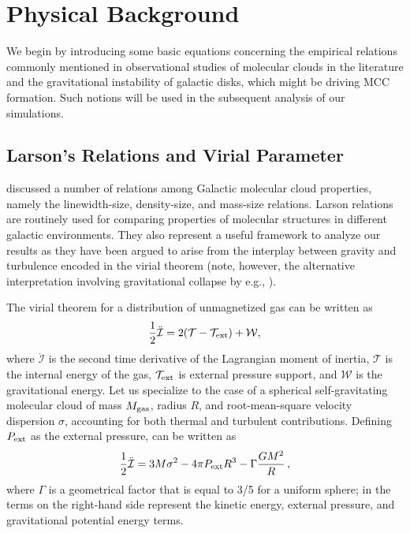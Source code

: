 \IfFileExists{emulateapjlegacy.cls}{\documentclass[iop]{emulateapjlegacy}}{\documentclass[iop]{emulateapj}}
\begin{document}
\section{Physical Background}\label{sec:Back}
We begin by introducing some basic equations concerning the empirical relations commonly mentioned in observational studies of molecular clouds in the literature and the gravitational instability of galactic disks, which might be driving MCC formation. Such notions will be used in the subsequent analysis of our simulations.

\subsection{Larson's Relations and Virial Parameter}\label{sec:PVE}
\citet{Larson81a} discussed a number of relations among Galactic
molecular cloud
properties, namely the linewidth-size, density-size, and mass-size relations. Larson relations are routinely used for comparing properties of molecular structures in different galactic environments. They also represent a useful framework to analyze our results as they
have been argued to arise from the interplay between gravity and turbulence encoded in the virial theorem
(note, however, the alternative interpretation involving gravitational collapse by
e.g., \citealt{Ballesteros-Paredes11a}).

The virial theorem for a distribution of unmagnetized gas can be written as \citep{McKee92a}
\begin{equation}\label{eqn:virial_th_general}
\frac{1}{2}\ddot{\mathcal{I}} = 2(\mathcal{T} - \mathcal{T}_{\rm ext}) + \mathcal{W},
\end{equation}
where $\ddot{\mathcal{I}}$ is the second time derivative of the Lagrangian moment of inertia, $\mathcal{T}$ is the internal energy of the gas, $\mathcal{T}_{\rm ext}$ is external pressure support, and $\mathcal{W}$ is the gravitational energy.
%
Let us specialize to the case of a spherical self-gravitating molecular cloud of mass $M_{\rm gas}$, radius $R$, and root-mean-square velocity dispersion $\sigma$, accounting for both thermal and turbulent contributions.
Defining $P_{\rm ext}$ as the external pressure,  can be written as
\begin{equation}
\frac{1}{2}{\ddot{\mathcal{I}}} = 3 M \sigma^2 - 4\pi P_{\rm ext} R^3 - \Gamma\frac{GM^2}{R}\,,
\label{eqn:virial}
\end{equation}
where $\Gamma$ is a geometrical factor that is equal to 3/5 for a uniform sphere; in  the terms on the right-hand side represent the kinetic energy, external pressure, and gravitational potential energy terms.
\end{document}
